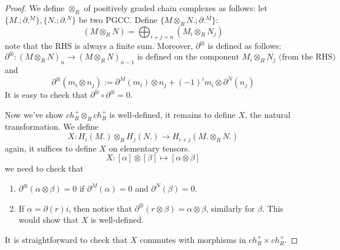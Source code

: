 \begin{proof}
    We define $\otimes_R$ of positively graded chain complexes as follows: let $\{M.;\partial.^M\}, \{N.;\partial.^N\}$ be two PGCC. Define $\{M\otimes_RN.;\partial.^M\}$:
    \begin{equation*}
        (M\otimes_RN)=\bigoplus_{i+j=n}(M_i\otimes_RN_j)
    \end{equation*} 
    note that the RHS is always a finite sum. Moreover, $\partial^\otimes$ is defined as follows:
    \begin{equation*}
        \partial^\otimes: (M\otimes_RN)_n\to (M\otimes_RN)_{n-1} \text{ is defined on the component $M_i\otimes_R N_j$ (from the RHS) }
    \end{equation*}
    and 
    \begin{equation*}
        \partial^\otimes(m_i\otimes n_j):=\partial^M(m_i)\otimes n_j+(-1)^im_i\otimes\partial^N(n_j)
    \end{equation*}
    It is easy to check that $\partial^\otimes\circ\partial^\otimes=0$.

    Now we've show $ch_R^+\otimes_Rch_R^+$ is well-defined, it remains to define $X$, the natural transformation. We define 
    \begin{equation*}
        X: H_i(M.)\otimes_R H_j(N.)\to H_{i+j}(M.\otimes_R N.)
    \end{equation*}
    again, it suffices to define $X$ on elementary tensors.
    \begin{equation*}
        X: [\alpha]\otimes[\beta]\mapsto [\alpha\otimes\beta]
    \end{equation*}
    we need to check that 
    \begin{enumerate}
        \item $\partial^\otimes(\alpha\otimes\beta)=0$ if $\partial^M(\alpha)=0$ and $\partial^N(\beta)=0$.
        \item If $\alpha=\partial(r)i$, then notice that $\partial^\otimes(r\otimes\beta)=\alpha\otimes\beta$, similarly for $\beta$. This would show that $X$ is well-defined. 
    \end{enumerate}
    It is straightforward to check that $X$ commutes with morphisms in $ch_R^+\times ch_R^+$.
\end{proof}

